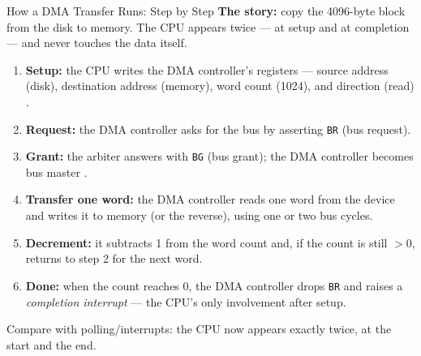 \documentclass[aspectratio=169]{beamer}
\begin{document}
\begin{frame}{How a DMA Transfer Runs: Step by Step}
  \footnotesize
  \textbf{The story:} copy the 4096-byte block from the disk to memory. The
  CPU appears twice --- at setup and at completion --- and never touches the
  data itself.
  \begin{enumerate}
    \item \textbf{Setup:} the CPU writes the DMA controller's registers ---
      source address (disk), destination address (memory), word count (1024),
      and direction (read) \cite{Stallings2015_computer_organization}.
    \item \textbf{Request:} the DMA controller asks for the bus by asserting
      \texttt{BR} (bus request).
    \item \textbf{Grant:} the arbiter answers with \texttt{BG} (bus grant);
      the DMA controller becomes bus master
      \cite{Hamacher2002_computer_organization}.
    \item \textbf{Transfer one word:} the DMA controller reads one word from
      the device and writes it to memory (or the reverse), using one or two
      bus cycles.
    \item \textbf{Decrement:} it subtracts 1 from the word count and, if the
      count is still $>0$, returns to step 2 for the next word.
    \item \textbf{Done:} when the count reaches 0, the DMA controller drops
      \texttt{BR} and raises a \emph{completion interrupt} --- the CPU's only
      involvement after setup.
  \end{enumerate}
  \vspace{0.2cm}
  Compare with polling/interrupts: the CPU now appears exactly twice,
  at the start and the end.
\end{frame}
\end{document}

